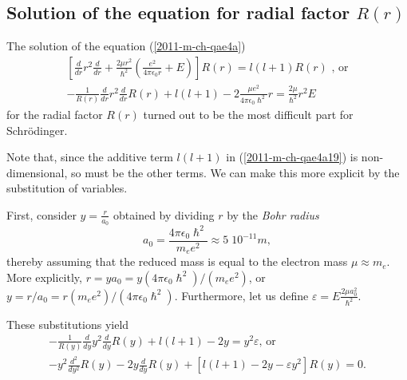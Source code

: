 \subsection{Solution of the equation  for radial factor $R(r)$}


The solution of the equation   (\ref{2011-m-ch-qae4a})
\begin{equation}
\begin{split}
\left[  \frac{   d   }{   d    r}  r^2\frac{   d   }{   d    r}   +
\frac{2\mu r^2}{\hslash^2} \left(\frac{e^2}{4\pi \epsilon_0r} + E \right) \right] R(r)
 =  l(l+1)  R( r ) \textrm{ , or}\\
-\frac{1}{R(r)} \frac{d}{   d    r}  r^2\frac{   d   }{   d    r} R( r ) +    l(l+1)
-
2
\frac{\mu e^2}{4\pi \epsilon_0\hslash^2} r
 = \frac{2\mu  }{ \hslash^2}  r^2 E
\end{split}
\label{2011-m-ch-qae4a19}
\end{equation}
for the radial factor $R(r)$
turned out to be the most difficult part for Schr\"odinger.\cite{Moore-Schroedinger}

Note that, since the additive term  $ l(l+1) $ in (\ref{2011-m-ch-qae4a19}) is non-dimensional,
so must be the other terms.
We can make this more explicit by the substitution of variables.

First, consider $y =\frac{r}{a_0}$ obtained by dividing $r$ by the
{\em Bohr radius}
\begin{equation}
a_0= \frac{4\pi \epsilon_0 \hslash^2}{m_e e^2}\approx 5\; 10^{-11} m,
\label{2011-m-ch-qaebohrr}
\end{equation}
thereby assuming that the reduced mass is equal to the electron mass $\mu \approx m_e$.
More explicitly,
$r=ya_0= y  (4\pi \epsilon_0 \hslash^2)/(m_e e^2)$,
or $y= r/a_0= r  (m_e e^2)/(4\pi \epsilon_0 \hslash^2)$.
Furthermore, let us define $\varepsilon = E \frac{2\mu a_0^2}{\hslash^2}$.

These substitutions yield
\begin{equation}
\begin{split}
-\frac{1}{R(y)} \frac{d}{   d    y}  y^2\frac{   d   }{   d    y} R( y ) +    l(l+1)
-2 y
 = y^2 \varepsilon \textrm{, or}\\
-y^2 \frac{d^2}{   d    y^2} R( y )  - 2 y \frac{   d   }{   d    y} R( y )
+ \left[   l(l+1) -2 y   -\varepsilon   y^2  \right] R( y )
 = 0.
\end{split}
\label{2011-m-ch-qae4a191}
\end{equation}

